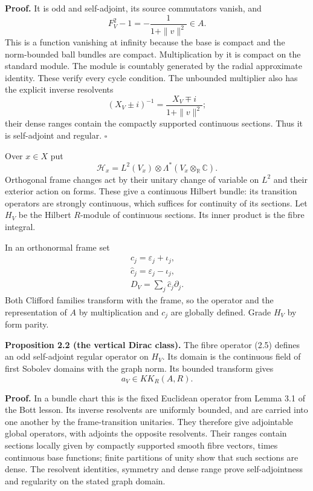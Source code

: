 \documentclass[
  11pt,
]{article}
\begin{document}
\textbf{Proof.} It is odd and self-adjoint, its source commutators
vanish, and \[
F_V^2-1=-\frac1{1+\|v\|^2}\in A.
\tag{2.3}
\] This is a function vanishing at infinity because the base is compact
and the norm-bounded ball bundles are compact. Multiplication by it is
compact on the standard module. The module is countably generated by the
radial approximate identity. These verify every cycle condition. The
unbounded multiplier also has the explicit inverse resolvents \[
(X_V\pm i)^{-1}=\frac{X_V\mp i}{1+\|v\|^2};
\] their dense ranges contain the compactly supported continuous
sections. Thus it is self-adjoint and regular. \(\square\)

Over \(x\in X\) put \[
\mathcal H_x=L^2(V_x)\otimes\Lambda^*(V_x\otimes_{\mathbb R}\mathbb C).
\tag{2.4}
\] Orthogonal frame changes act by their unitary change of variable on
\(L^2\) and their exterior action on forms. These give a continuous
Hilbert bundle: its transition operators are strongly continuous, which
suffices for continuity of its sections. Let \(H_V\) be the Hilbert
\(R\)-module of continuous sections. Its inner product is the fibre
integral.

In an orthonormal frame set \[
\begin{gathered}
c_j=\varepsilon_j+\iota_j,\\
\widehat c_j=\varepsilon_j-\iota_j,\\
D_V=\sum_j\widehat c_j\partial_j.
\end{gathered}
\tag{2.5}
\] Both Clifford families transform with the frame, so the operator and
the representation of \(A\) by multiplication and \(c_j\) are globally
defined. Grade \(H_V\) by form parity.

\textbf{Proposition 2.2 (the vertical Dirac class).} The fibre operator
(2.5) defines an odd self-adjoint regular operator on \(H_V\). Its
domain is the continuous field of first Sobolev domains with the graph
norm. Its bounded transform gives \[
a_V\in KK_R(A,R).
\tag{2.6}
\]

\textbf{Proof.} In a bundle chart this is the fixed Euclidean operator
from Lemma 3.1 of the Bott lesson. Its inverse resolvents are uniformly
bounded, and are carried into one another by the frame-transition
unitaries. They therefore give adjointable global operators, with
adjoints the opposite resolvents. Their ranges contain sections locally
given by compactly supported smooth fibre vectors, times continuous base
functions; finite partitions of unity show that such sections are dense.
The resolvent identities, symmetry and dense range prove
self-adjointness and regularity on the stated graph domain.
\end{document}
